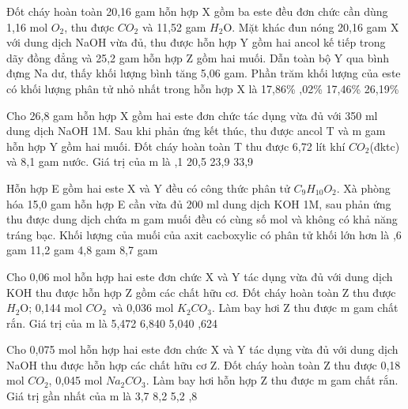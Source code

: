 \begin{vdex}[2]%
	Đốt cháy hoàn toàn 20,16 gam hỗn hợp X gồm ba este đều đơn chức cần dùng 1,16 mol ${O}_2$, thu được ${CO}_2$ và 11,52 gam ${H}_2$O. Mặt khác đun nóng 20,16 gam X với dung dịch NaOH vừa đủ, thu được hỗn hợp Y gồm hai ancol kế tiếp trong dãy đồng đẳng và 25,2 gam hỗn hợp Z gồm hai muối. Dẫn toàn bộ Y qua bình đựng Na dư, thấy khối lượng bình tăng 5,06 gam. Phần trăm khối lượng của este có khối lượng phân tử nhỏ nhất trong hỗn hợp X là
	\choice
	{ 17,86\%}
	{,02\%}
	{ 17,46\%}
	{ 26,19\%}
	\huongdan{%
		
}
\end{vdex}

\begin{vdex}[2][(Sở HN – L2 - 2020)]%
	Cho 26,8 gam hỗn hợp X gồm hai este đơn chức tác dụng vừa đủ với 350 ml dung dịch NaOH 1M. Sau khi phản ứng kết thúc, thu được ancol T và m gam hỗn hợp Y gồm hai muối. Đốt cháy hoàn toàn T thu được 6,72 lít khí ${CO}_2$(đktc) và 8,1 gam nước. Giá trị của m là
	\choice
	{,1}
	{ 20,5}
	{ 23,9}
	{ 33,9}
	\huongdan
	{%
		
	}
\end{vdex}

\begin{vdex}[3]%
	Hỗn hợp E gồm hai este X và Y đều có công thức phân tử ${C}_9{H}_{10}{O}_2$. Xà phòng hóa 15,0 gam hỗn hợp E cần vừa đủ 200 ml dung dịch KOH 1M, sau phản ứng thu được dung dịch chứa m gam muối đều có cùng số mol và không có khả năng tráng bạc. Khối lượng của muối của axit cacboxylic có phân tử khối lớn hơn là
	\choice
	{,6 gam}
	{ 11,2 gam}
	{ 4,8 gam}
	{ 8,7 gam}
	\huongdan
	{%
		
		}
\end{vdex}

\begin{vdex}[3][(Sở HN – L3 – 2020)]%
	Cho 0,06 mol hỗn hợp hai este đơn chức X và Y tác dụng vừa đủ với dung dịch KOH thu được hỗn hợp Z gồm các chất hữu cơ. Đốt cháy hoàn toàn Z thu được ${H}_2$O; 0,144 mol ${CO}_2$ và 0,036 mol ${K}_2{CO}_3$. Làm bay hơi Z thu được m gam chất rắn. Giá trị của m là
	\choice
	{ 5,472}
	{ 6,840}
	{ 5,040}
	{,624}
	\huongdan
	{%
		}
\end{vdex}

\begin{vdex}[3][Sở TN – L1 - 2020]%
	Cho 0,075 mol hỗn hợp hai este đơn chức X và Y tác dụng vừa đủ với dung dịch NaOH thu được hỗn hợp các chất hữu cơ Z. Đốt cháy hoàn toàn Z thu được 0,18 mol ${CO}_2$, 0,045 mol ${Na}_2{CO}_3$. Làm bay hơi hỗn hợp Z thu được m gam chất rắn. Giá trị gần nhất của m là
	\choice
	{ 3,7}
	{ 8,2}
	{ 5,2}
	{,8}
	\huongdan
	{%
		
		}
\end{vdex}

